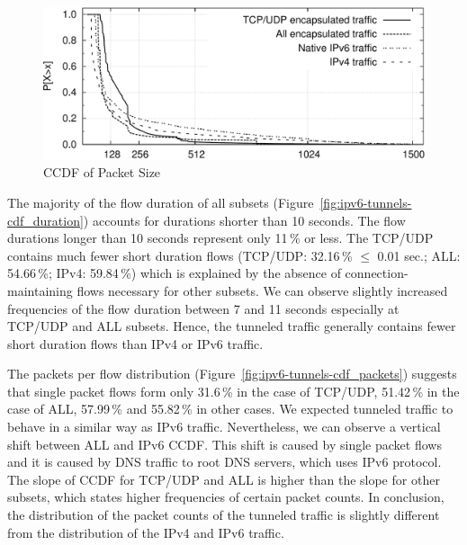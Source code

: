 \begin{figure}[!tb]
     \centering
     \includegraphics[width=1.00\textwidth]{figures/paper-tunnels/cdf_functions/cdf_bytes}
     \caption{CCDF of Packet Size}
     \label{fig:ipv6-tunnels-cdf_bytes}
\end{figure}

The majority of the flow duration of all subsets (Figure~\ref{fig:ipv6-tunnels-cdf_duration}) accounts for durations shorter than 10 seconds. The flow durations longer than 10 seconds represent only 11\,\% or less. The TCP/UDP contains much fewer short duration flows (TCP/UDP: 32.16\,\% $\leq$ 0.01 sec.; ALL: 54.66\,\%; IPv4: 59.84\,\%) which is explained by the absence of connection-maintaining flows necessary for other subsets. We can observe slightly increased frequencies of the flow duration between 7 and 11 seconds especially at TCP/UDP and ALL subsets. Hence, the tunneled traffic generally contains fewer short duration flows than IPv4 or IPv6 traffic.

The packets per flow distribution (Figure~\ref{fig:ipv6-tunnels-cdf_packets}) suggests that single packet flows form only 31.6\,\% in the case of TCP/UDP, 51.42\,\% in the case of ALL, 57.99\,\% and 55.82\,\% in other cases. We expected tunneled traffic to behave in a similar way as IPv6 traffic. Nevertheless, we can observe a vertical shift between ALL and IPv6 CCDF. This shift is caused by single packet flows and it is caused by DNS traffic to root DNS servers, which uses IPv6 protocol. The slope of CCDF for TCP/UDP and ALL is higher than the slope for other subsets, which states higher frequencies of certain packet counts. In conclusion, the distribution of the packet counts of the tunneled traffic is slightly different from the distribution of the IPv4 and IPv6 traffic.

